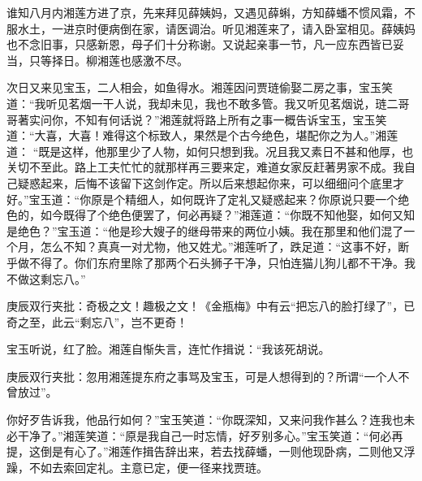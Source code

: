 \begin{parag}
    谁知八月内湘莲方进了京，先来拜见薛姨妈，又遇见薛蝌，方知薛蟠不惯风霜，不服水土，一进京时便病倒在家，请医调治。听见湘莲来了，请入卧室相见。薛姨妈也不念旧事，只感新恩，母子们十分称谢。又说起亲事一节，凡一应东西皆已妥当，只等择日。柳湘莲也感激不尽。
\end{parag}


\begin{parag}
    次日又来见宝玉，二人相会，如鱼得水。湘莲因问贾琏偷娶二房之事，宝玉笑道：“我听见茗烟一干人说，我却未见，我也不敢多管。我又听见茗烟说，琏二哥哥著实问你，不知有何话说？”湘莲就将路上所有之事一概告诉宝玉，宝玉笑道：“大喜，大喜！难得这个标致人，果然是个古今绝色，堪配你之为人。”湘莲道： “既是这样，他那里少了人物，如何只想到我。况且我又素日不甚和他厚，也关切不至此。路上工夫忙忙的就那样再三要来定，难道女家反赶著男家不成。我自己疑惑起来，后悔不该留下这剑作定。所以后来想起你来，可以细细问个底里才好。”宝玉道：“你原是个精细人，如何既许了定礼又疑惑起来？你原说只要一个绝色的，如今既得了个绝色便罢了，何必再疑？”湘莲道：“你既不知他娶，如何又知是绝色？”宝玉道：“他是珍大嫂子的继母带来的两位小姨。我在那里和他们混了一个月，怎么不知？真真一对尤物，他又姓尤。”湘莲听了，跌足道：“这事不好，断乎做不得了。你们东府里除了那两个石头狮子干净，只怕连猫儿狗儿都不干净。我不做这剩忘八。”\begin{note}庚辰双行夹批：奇极之文！趣极之文！《金瓶梅》中有云“把忘八的脸打绿了”，已奇之至，此云“剩忘八”，岂不更奇！\end{note}宝玉听说，红了脸。湘莲自惭失言，连忙作揖说：“我该死胡说。\begin{note}庚辰双行夹批：忽用湘莲提东府之事骂及宝玉，可是人想得到的？所谓“一个人不曾放过”。\end{note}你好歹告诉我，他品行如何？”宝玉笑道：“你既深知，又来问我作甚么？连我也未必干净了。”湘莲笑道：“原是我自己一时忘情，好歹别多心。”宝玉笑道：“何必再提，这倒是有心了。”湘莲作揖告辞出来，若去找薛蟠，一则他现卧病，二则他又浮躁，不如去索回定礼。主意已定，便一径来找贾琏。
\end{parag}


